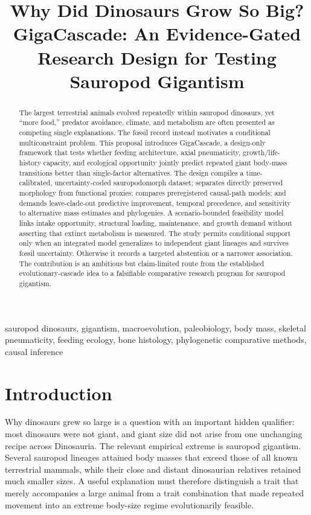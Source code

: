\documentclass[conference]{IEEEtran}
\newcommand{\gc}{GigaCascade}
\begin{document}
\title{Why Did Dinosaurs Grow So Big?\\
\gc: An Evidence-Gated Research Design for Testing Sauropod Gigantism}

\author{}
\maketitle

\begin{abstract}
The largest terrestrial animals evolved repeatedly within sauropod dinosaurs, yet ``more food,'' predator avoidance, climate, and metabolism are often presented as competing single explanations. The fossil record instead motivates a conditional multiconstraint problem. This proposal introduces \gc, a design-only framework that tests whether feeding architecture, axial pneumaticity, growth/life-history capacity, and ecological opportunity jointly predict repeated giant body-mass transitions better than single-factor alternatives. The design compiles a time-calibrated, uncertainty-coded sauropodomorph dataset; separates directly preserved morphology from functional proxies; compares preregistered causal-path models; and demands leave-clade-out predictive improvement, temporal precedence, and sensitivity to alternative mass estimates and phylogenies. A scenario-bounded feasibility model links intake opportunity, structural loading, maintenance, and growth demand without asserting that extinct metabolism is measured. The study permits conditional support only when an integrated model generalizes to independent giant lineages and survives fossil uncertainty. Otherwise it records a targeted abstention or a narrower association. The contribution is an ambitious but claim-limited route from the established evolutionary-cascade idea to a falsifiable comparative research program for sauropod gigantism.
\end{abstract}

\begin{IEEEkeywords}
sauropod dinosaurs, gigantism, macroevolution, paleobiology, body mass, skeletal pneumaticity, feeding ecology, bone histology, phylogenetic comparative methods, causal inference
\end{IEEEkeywords}

\section{Introduction}

Why dinosaurs grew so large is a question with an important hidden qualifier: most dinosaurs were not giant, and giant size did not arise from one unchanging recipe across Dinosauria. The relevant empirical extreme is sauropod gigantism. Several sauropod lineages attained body masses that exceed those of all known terrestrial mammals, while their close and distant dinosaurian relatives retained much smaller sizes. A useful explanation must therefore distinguish a trait that merely accompanies a large animal from a trait combination that made repeated movement into an extreme body-size regime evolutionarily feasible.
\end{document}
